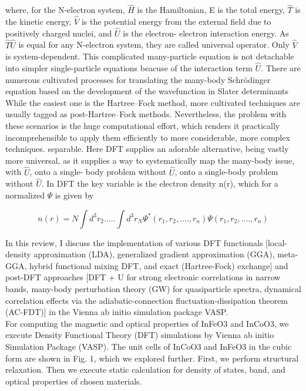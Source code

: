 \documentclass[12pt, letterpaper]{article}
\newcommand*{\1}{\hspace{1pt}}
\begin{document}
    where, for the N-electron system, $\hat{H}$ is the Hamiltonian, E is the total energy, $\hat{T}$ is the kinetic energy, $\hat{V}$
    is the potential energy from the external field due to positively charged nuclei, and $\hat{U}$ is the electron-
    electron interaction energy. As $\hat{T} \hat{U}$ is equal for any N-electron system, they are called universal operator.
    Only $\hat{V}$ is system-dependent. This complicated many-particle equation is not detachable
    into simpler single-particle equations beacuse of the interaction term $\hat{U}$.
    There are numerous cultivated processes for translating the many-body 
    Schrödinger equation based on the development of the wavefunction in Slater determinants While the easiest one is the Hartree–Fock method, more cultivated techniques are usually tagged as post-Hartree–Fock
    methods. Nevertheless, the problem with these scenarios is the huge 
    computational effort, which renders it practically incomprehensible to apply them 
    efficiently to more considerable, more complex techniques.
    separable. Here DFT supplies an adorable alternative, being vastly more universal, 
    as it supplies a way to systematically map the many-body issue, with $\hat{U}$, onto a single-
    body problem without $\hat{U}$, onto a single-body problem without $\hat{U}$. In DFT the key variable
    is the electron density n(r), which for a normalized $\Psi$ is given by 

    \begin{equation}
        n(r) = N \int d^{3}r_{2} ..... \int d^{3}r_{N}\Psi^{*}(r_{1},r_{2},....,r_{n})\Psi(r_{1},r_{2},....,r_{n})
    \end{equation}

    In this review, I discuss the implementation of various DFT functionals [local-density approximation (LDA), generalized gradient approximation (GGA), 
    meta-GGA, hybrid functional mixing DFT, and exact (Hartree-Fock) exchange] and post-DFT approaches 
    [DFT + U for strong electronic correlations in narrow bands, many-body perturbation theory (GW) for quasiparticle spectra, 
    dynamical correlation effects via the adiabatic-connection fluctuation-dissipation theorem (AC-FDT)] in the 
    Vienna ab initio simulation package VASP. \\ 

    For computing the magnetic and optical properties of InFeO3 and InCoO3, we execute Density Functional Theory (DFT)\cite{r5,r6,r7,r8} simulations by  Vienna ab initio Simulation 
    Package (VASP)\cite{r9,r10,r11}. The unit cells of InCoO3 and InFeO3 in the cubic form are shown in Fig. 1, which we explored further. First, we perform structural relaxation. 
    Then we execute static calculation for density of states, band, and optical properties of chosen materials. 
    
\end{document}
